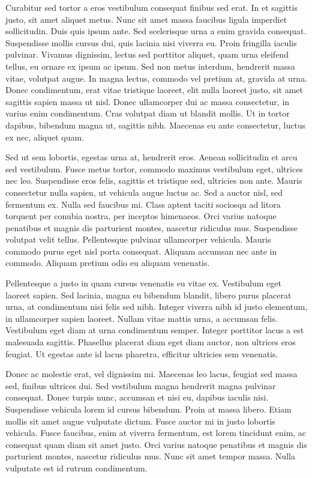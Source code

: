 Curabitur sed tortor a eros vestibulum consequat finibus sed erat. In et
sagittis justo, sit amet aliquet metus. Nunc sit amet massa faucibus ligula
imperdiet sollicitudin. Duis quis ipsum ante. Sed scelerisque urna a enim
gravida consequat. Suspendisse mollis cursus dui, quis lacinia nisi viverra eu.
Proin fringilla iaculis pulvinar. Vivamus dignissim, lectus sed porttitor
aliquet, quam urna eleifend tellus, eu ornare ex ipsum ac ipsum. Sed non metus
interdum, hendrerit massa vitae, volutpat augue. In magna lectus, commodo vel
pretium at, gravida at urna. Donec condimentum, erat vitae tristique laoreet,
elit nulla laoreet justo, sit amet sagittis sapien massa ut nisl. Donec
ullamcorper dui ac massa consectetur, in varius enim condimentum. Cras volutpat
diam ut blandit mollis. Ut in tortor dapibus, bibendum magna ut, sagittis nibh.
Maecenas eu ante consectetur, luctus ex nec, aliquet quam.

Sed ut sem lobortis, egestas urna at, hendrerit eros. Aenean sollicitudin et
arcu sed vestibulum. Fusce metus tortor, commodo maximus vestibulum eget,
ultrices nec leo. Suspendisse eros felis, sagittis et tristique sed, ultricies
non ante. Mauris consectetur nulla sapien, ut vehicula augue luctus ac. Sed a
auctor nisl, sed fermentum ex. Nulla sed faucibus mi. Class aptent taciti
sociosqu ad litora torquent per conubia nostra, per inceptos himenaeos. Orci
varius natoque penatibus et magnis dis parturient montes, nascetur ridiculus
mus. Suspendisse volutpat velit tellus. Pellentesque pulvinar ullamcorper
vehicula. Mauris commodo purus eget nisl porta consequat. Aliquam accumsan nec
ante in commodo. Aliquam pretium odio eu aliquam venenatis.

Pellentesque a justo in quam cursus venenatis eu vitae ex. Vestibulum eget
laoreet sapien. Sed lacinia, magna eu bibendum blandit, libero purus placerat
urna, at condimentum nisi felis sed nibh. Integer viverra nibh id justo
elementum, in ullamcorper sapien laoreet. Nullam vitae mattis urna, a accumsan
felis. Vestibulum eget diam at urna condimentum semper. Integer porttitor lacus
a est malesuada sagittis. Phasellus placerat diam eget diam auctor, non
ultrices eros feugiat. Ut egestas ante id lacus pharetra, efficitur ultricies
sem venenatis.

Donec ac molestie erat, vel dignissim mi. Maecenas leo lacus, feugiat sed massa
sed, finibus ultrices dui. Sed vestibulum magna hendrerit magna pulvinar
consequat. Donec turpis nunc, accumsan et nisi eu, dapibus iaculis nisi.
Suspendisse vehicula lorem id cursus bibendum. Proin at massa libero. Etiam
mollis sit amet augue vulputate dictum. Fusce auctor mi in justo lobortis
vehicula. Fusce faucibus, enim at viverra fermentum, est lorem tincidunt enim,
ac consequat quam diam sit amet justo. Orci varius natoque penatibus et magnis
dis parturient montes, nascetur ridiculus mus. Nunc sit amet tempor massa.
Nulla vulputate est id rutrum condimentum.

